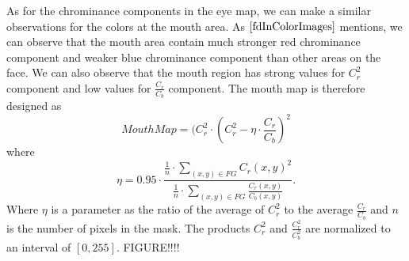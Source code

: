 As for the chrominance components in the eye map, we can make a similar observations for the colors at the mouth area. As $\cite{fdInColorImages}$ mentions, we can observe that the mouth area contain much stronger red chrominance component and weaker blue chrominance component than other areas on the face. We can also observe that the mouth region has strong values for $C_r^2$ component and low values for $\frac{C_r}{C_b}$ component. The mouth map is therefore designed as
\newline
\newline
\begin{equation}
MouthMap = (C_r^2 \cdot (C_r^2 - \eta \cdot \frac{C_r}{C_b})^2
\end{equation}
\newline
where
\newline
\begin{equation}
\eta = 0.95 \cdot \frac{\frac{1}{n} \cdot \sum\limits_{(x,y) \in FG} C_r(x,y)^2}{\frac{1}{n} \cdot \sum\limits_{(x,y) \in FG} \frac{C_r(x,y)}{C_b(x,y)}}.
\end{equation}
\newline
Where $\eta$ is a parameter as the ratio of the average of $C_r^2$ to the average $\frac{C_r}{C_b}$ and $n$ is the number of pixels in the mask. The products $C_r^2$ and $\frac{C_r^2}{C_b^2}$ are normalized to an interval of $[0,255]$. FIGURE!!!!
